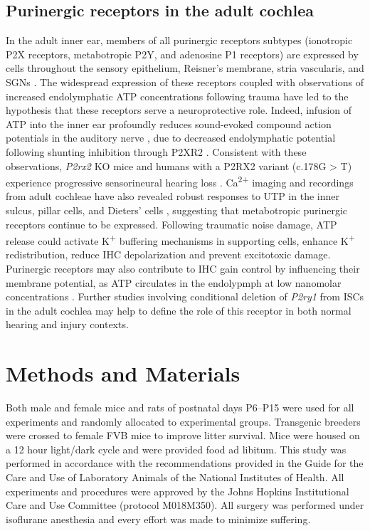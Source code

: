 \documentclass[9pt,lineno]{elife}
\begin{document}
\subsection{Purinergic receptors in the adult cochlea}
In the adult inner ear, members of all purinergic receptors subtypes (ionotropic P2X receptors, metabotropic P2Y, and adenosine P1 receptors) are expressed by cells throughout the sensory epithelium, Reisner’s membrane, stria vascularis, and SGNs \citep{Housley2009a,Huang2010}. The widespread expression of these receptors coupled with observations of increased endolymphatic ATP concentrations following trauma \citep{Munoz1995} have led to the hypothesis that these receptors serve a neuroprotective role. Indeed, infusion of ATP into the inner ear profoundly reduces sound-evoked compound action potentials in the auditory nerve \citep{Bobbin1978a,Munoz1995b}, due to decreased endolymphatic potential following shunting inhibition through P2XR2 \citep{Housley2013b}. Consistent with these observations, \textit{P2rx2} KO mice and humans with a P2RX2 variant (c.178G > T) experience progressive sensorineural hearing loss \citep{Yan2013a}. Ca\textsuperscript{2+} imaging and recordings from adult cochleae have also revealed robust responses to UTP in the inner sulcus, pillar cells, and Dieters' cells \citep{Sirko2019,Zhu2010a}, suggesting that metabotropic purinergic receptors continue to be expressed. Following traumatic noise damage, ATP release could activate K\textsuperscript{+} buffering mechanisms in supporting cells, enhance K\textsuperscript{+} redistribution, reduce IHC depolarization and prevent excitotoxic damage. Purinergic receptors may also contribute to IHC gain control by influencing their membrane potential, as ATP circulates in the endolypmph at low nanomolar concentrations \citep{Munoz1995}. Further studies involving conditional deletion of \textit{P2ry1} from ISCs in the adult cochlea may help to define the role of this receptor in both normal hearing and injury contexts.


\section{Methods and Materials}

Both male and female mice and rats of postnatal days P6--P15 were used for all experiments and randomly allocated to experimental groups. Transgenic breeders were crossed to female FVB mice to improve litter survival. Mice were housed on a 12 hour light/dark cycle and were provided food ad libitum. This study was performed in accordance with the recommendations provided in the Guide for the Care and Use of Laboratory Animals of the National Institutes of Health. All experiments and procedures were approved by the Johns Hopkins Institutional Care and Use Committee (protocol M018M350). All surgery was performed under isoflurane anesthesia and every effort was made to minimize suffering.
\end{document}
